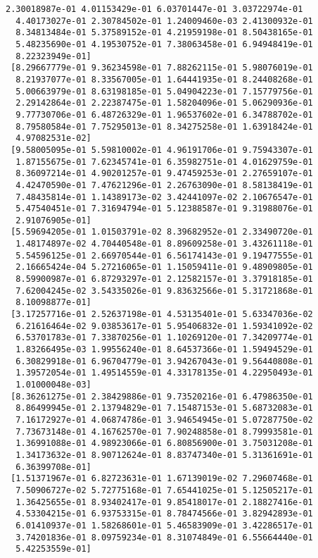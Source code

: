 \documentclass[11pt]{article}
\begin{document}
\begin{Verbatim}[commandchars=\\\{\}]
  2.30018987e-01 4.01153429e-01 6.03701447e-01 3.03722974e-01
  4.40173027e-01 2.30784502e-01 1.24009460e-03 2.41300932e-01
  8.34813484e-01 5.37589152e-01 4.21959198e-01 8.50438165e-01
  5.48235690e-01 4.19530752e-01 7.38063458e-01 6.94948419e-01
  8.22323949e-01]
 [8.29667779e-01 9.36234598e-01 7.88262115e-01 5.98076019e-01
  8.21937077e-01 8.33567005e-01 1.64441935e-01 8.24408268e-01
  5.00663979e-01 8.63198185e-01 5.04904223e-01 7.15779756e-01
  2.29142864e-01 2.22387475e-01 1.58204096e-01 5.06290936e-01
  9.77730706e-01 6.48726329e-01 1.96537602e-01 6.34788702e-01
  8.79580584e-01 7.75295013e-01 8.34275258e-01 1.63918424e-01
  4.97082531e-02]
 [9.58005095e-01 5.59810002e-01 4.96191706e-01 9.75943307e-01
  1.87155675e-01 7.62345741e-01 6.35982751e-01 4.01629759e-01
  8.36097214e-01 4.90201257e-01 9.47459253e-01 2.27659107e-01
  4.42470590e-01 7.47621296e-01 2.26763090e-01 8.58138419e-01
  7.48435814e-01 1.14389173e-02 3.42441097e-02 2.10676547e-01
  5.47540451e-01 7.31694794e-01 5.12388587e-01 9.31988076e-01
  2.91076905e-01]
 [5.59694205e-01 1.01503791e-02 8.39682952e-01 2.33490720e-01
  1.48174897e-02 4.70440548e-01 8.89609258e-01 3.43261118e-01
  5.54596125e-01 2.66970544e-01 6.56174143e-01 9.19477555e-01
  2.16665424e-04 5.27216065e-01 1.15059411e-01 9.48909805e-01
  8.59900987e-01 6.87293297e-01 2.12582157e-01 3.37918185e-01
  7.62004245e-02 3.54335026e-01 9.83632566e-01 5.31721868e-01
  8.10098877e-01]
 [3.17257716e-01 2.52637198e-01 4.53135401e-01 5.63347036e-02
  6.21616464e-02 9.03853617e-01 5.95406832e-01 1.59341092e-02
  6.53701783e-01 7.33870256e-01 1.10269120e-01 7.34209774e-01
  1.83266495e-03 1.99556240e-01 8.64537366e-01 1.59494529e-01
  6.30829918e-01 6.96704779e-01 3.94267043e-01 9.56440808e-01
  1.39572054e-01 1.49514559e-01 4.33178135e-01 4.22950493e-01
  1.01000048e-03]
 [8.36261275e-01 2.38429886e-01 9.73520216e-01 6.47986350e-01
  8.86499945e-01 2.13794829e-01 7.15487153e-01 5.68732083e-01
  7.16172927e-01 4.06874786e-01 3.94654945e-01 5.07287750e-02
  7.73673148e-01 4.16762570e-01 7.90248858e-01 8.79993581e-01
  1.36991088e-01 4.98923066e-01 6.80856900e-01 3.75031208e-01
  1.34173632e-01 8.90712624e-01 8.83747340e-01 5.31361691e-01
  6.36399708e-01]
 [1.51371967e-01 6.82723631e-01 1.67139019e-02 7.29607468e-01
  7.50906727e-02 5.72775168e-01 7.65441025e-01 5.12505217e-01
  1.36425655e-01 8.93402417e-01 9.85418017e-01 2.18827416e-01
  4.53304215e-01 6.93753315e-01 8.78474566e-01 3.82942893e-01
  6.01410937e-01 1.58268601e-01 5.46583909e-01 3.42286517e-01
  3.74201836e-01 8.09759234e-01 8.31074849e-01 6.55664440e-01
  5.42253559e-01]

\end{Verbatim}
\end{document}
